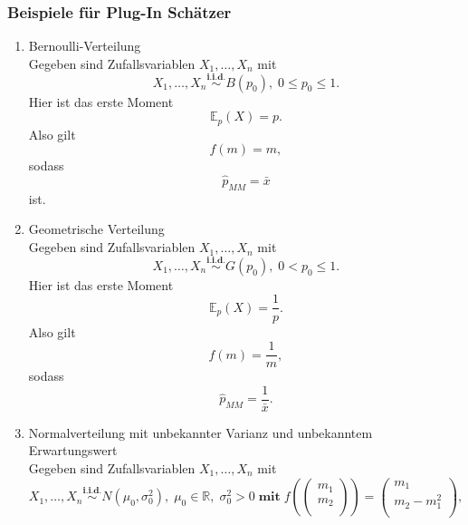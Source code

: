 \documentclass[10pt]{article}
\newcommand{\FZV}{X_1, \ldots, X_n} %
\newcommand{\IR}{\mathbb{R}} %
\newcommand{\EW}{\mathbb{E}} %
\begin{document}
\subsubsection{Beispiele für Plug-In Schätzer}
	\begin{enumerate}[label = (\roman*)]
	\item Bernoulli-Verteilung \\
	Gegeben sind Zufallsvariablen $\FZV$ mit
	\begin{equation*}
		\FZV \overset{\textbf{i.i.d.}}{\sim} B(p_0), \; 0 \leq p_0 \leq 1.
	\end{equation*} 
	Hier ist das erste Moment
	\begin{equation*}
		\EW_p(X)=p.
	\end{equation*}
	Also gilt
	\begin{equation*}
		f(m)=m,
	\end{equation*}
	sodass
	\begin{equation*}
		\hat{p}_{MM} = \bar{x} 
	\end{equation*}
	ist.
	
	\item Geometrische Verteilung \\
	Gegeben sind Zufallsvariablen $\FZV$ mit
	\begin{equation*}
		\FZV \overset{\textbf{i.i.d.}}{\sim} G(p_0), \; 0 < p_0 \leq 1.
	\end{equation*} 
	Hier ist das erste Moment
	\begin{equation*}
		\EW_p(X) = \frac{1}{p}.
	\end{equation*}
	Also gilt
	\begin{equation*}
		f(m)=\frac{1}{m},
	\end{equation*}
	sodass
	\begin{equation*}
		\hat{p}_{MM} = \frac{1}{\bar{x}}.
	\end{equation*}
	
	
	\item Normalverteilung mit unbekannter Varianz und unbekanntem Erwartungswert\\
	Gegeben sind Zufallsvariablen $\FZV$ mit
	\begin{equation*}
		\FZV \overset{\textbf{i.i.d.}} {\sim} N(\mu_0,\sigma_0^2),\; \mu_0 \in \IR, \; \sigma_0^2 >0 \; \textbf{mit} \; 	f(\left(
		\begin{array}{c}
			m_1\\
			m_2\\
		\end{array}
		\right)) = 
		\left(
		\begin{array}{c}
			m_1\\
			m_2 - m_1^2\\
		\end{array}
		\right),
	\end{equation*} 


\end{enumerate}
\end{document}
